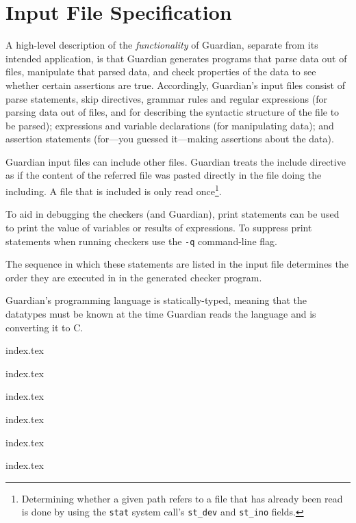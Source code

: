 
\chapter{Input File Specification}
{
	A high-level description of the \textit{functionality} of Guardian, separate
	from its intended application, is that Guardian generates programs that
	parse data out of files, manipulate that parsed data, and check
	properties of the data to see whether certain assertions are true.
	Accordingly, Guardian's input files
	consist of parse statements, skip directives, grammar rules and regular
	expressions (for
	parsing data out of files, and for describing the syntactic structure of
	the file to be parsed); expressions and variable declarations
	(for manipulating data); and assertion
	statements (for---you guessed it---making assertions about the data).
	
	Guardian input files can include other files. Guardian treats the
	include directive as if the content of the referred file was pasted
	directly in the file doing the including. A file that is included is
	only read
	once\footnote{Determining whether a given path refers to a file that has
	already been read is done by using the \texttt{stat} system
	call's \texttt{st\_dev} and \texttt{st\_ino} fields.}.
	
	To aid in debugging the checkers (and Guardian), print
	statements can be used to print the value of variables or
	results of expressions. To suppress print statements when running
	checkers use
	the \texttt{-q} command-line flag.
	
	The sequence in which these statements
	are listed in the input file determines the
	order they are executed in in the generated checker program.
	
	Guardian's programming language is statically-typed, meaning that the
	datatypes
	must be known at the time Guardian reads the language and is
	converting it to C.
	
	{index.tex}
	
	{index.tex}
	
	{index.tex}
	
	{index.tex}
	
	{index.tex}
	
	{index.tex}
}











